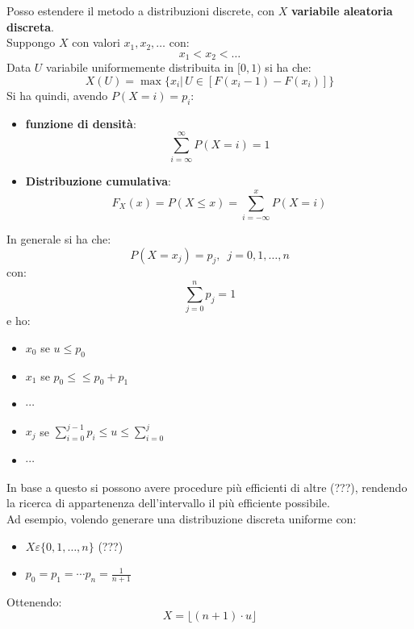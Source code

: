 \documentclass[a4paper,12pt, oneside]{book}
\begin{document}
Posso estendere il metodo a distribuzioni discrete, con $X$ \textbf{variabile
  aleatoria discreta}. \\
Suppongo $X$ con valori $x_1,x_2,\ldots$ con:
\[x_1<x_2<\ldots\]
Data $U$ variabile uniformemente distribuita in $[0,1)$ si ha che:
\[X(U)=\max\{x_i|\,U\in[F(x_i-1)-F(x_i)]\}\]
Si ha quindi, avendo $P(X=i)=p_i$:
\begin{itemize}
  \item \textbf{funzione di densità}:
  \[\sum_{i=\infty}^\infty P(X=i)=1\]
  \item \textbf{Distribuzione cumulativa}:
  \[F_X(x)=P(X\leq x)=\sum_{i=-\infty}^xP(X=i)\]
\end{itemize}
In generale si ha che:
\[P(X=x_j)=p_j,\,\,\,j=0,1,\ldots, n\]
con:
\[\sum_{j=0}^np_j=1\]
e ho:
\begin{itemize}
  \item $x_0$ se $u\leq p_0$
  \item $x_1$ se $p_0\leq \leq p_0+p_1$
  \item $\cdots$
  \item $x_j$ se $\sum_{i=0}^{j-1} p_i\leq u\leq\sum_{i=0}^j$
  \item $\cdots$
\end{itemize}
In base a questo si possono avere procedure più efficienti di altre (???),
rendendo la ricerca di appartenenza dell'intervallo il più efficiente
possibile.\\
Ad esempio, volendo generare una distribuzione discreta uniforme con:
\begin{itemize}
  \item $X\varepsilon\{0,1,\ldots,n\}$ (???)
  \item $p_0=p_1=\cdots p_n=\frac{1}{n+1}$ 
\end{itemize}
Ottenendo:
\[X=\lfloor (n+1)\cdot u\rfloor\]
\end{document}

